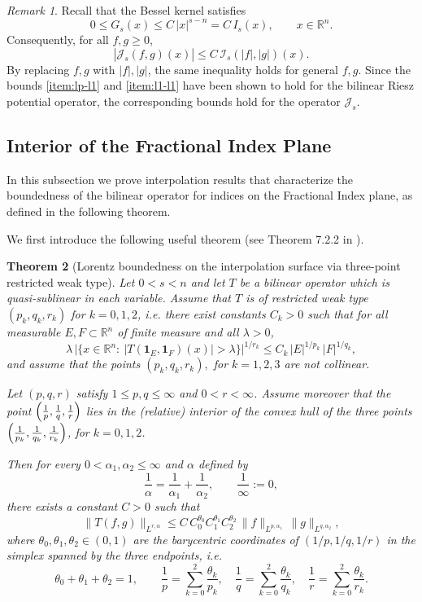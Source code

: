 \documentclass[12pt]{article}
\newtheorem{theorem}{Theorem}[section]
\theoremstyle{definition}
\theoremstyle{remark}
\newtheorem{remark}[theorem]{Remark}
\numberwithin{equation}{section}
\begin{document}
\begin{remark}
Recall that the Bessel kernel satisfies
\[
0\le G_s(x)\le C\,|x|^{s-n}=C\,I_s(x),
\qquad x\in\mathbb R^n.
\]
Consequently, for all $f,g\ge0$,
\begin{equation} \label{eq:riesz-dominates}
|\mathcal{J}_s(f,g)(x)|
\le C\,\mathcal{I}_s(|f|,|g|)(x).
\end{equation}
By replacing $f,g$ with $|f|,|g|$, the same inequality holds for general $f,g$.
Since the bounds \eqref{item:lp-l1} and \eqref{item:l1-l1} have been shown to hold for the bilinear Riesz potential operator,
the corresponding bounds hold for the operator $\mathcal{J}_s$.
\end{remark} 


\subsection{Interior of the Fractional Index Plane}

In this subsection we prove interpolation results that characterize the boundedness of the bilinear operator for indices on the Fractional Index plane, as defined in the following theorem. 

We first introduce the following useful theorem (see Theorem 7.2.2 in \cite{GraMod}).
\begin{theorem}[Lorentz boundedness on the interpolation surface via three-point restricted weak type]
\label{lem:convex-hull-surface}
Let $0<s<n$ and let $T$ be a bilinear operator which is quasi-sublinear in each variable. 
Assume that $T$ is of restricted weak type $(p_k,q_k,r_k)$ for $k=0,1,2$, i.e.
there exist constants $C_k>0$ such that for all measurable $E,F\subset\mathbb R^n$
of finite measure and all $\lambda>0$,
\begin{equation}\label{eq:rwk-3pts}
\lambda\,
\bigl|\{x\in\mathbb R^n:\ |T(\mathbf 1_E,\mathbf 1_F)(x)|>\lambda\}\bigr|^{1/r_k}
\le C_k\,|E|^{1/p_k}\,|F|^{1/q_k},
\end{equation} and assume that the points $(p_k,q_k,r_k),$ for $k=1,2,3$ are not collinear.

Let $(p,q,r)$ satisfy $1\le p,q\le\infty$ and $0<r<\infty$.
Assume moreover that the point $\Bigl(\frac1p,\frac1q,\frac1r\Bigr)$ lies in the (relative) interior of the convex hull of the three points
$\Bigl(\frac1{p_k},\frac1{q_k},\frac1{r_k}\Bigr)$, for $k=0,1,2$.

Then for every $0<\alpha_1,\alpha_2\le\infty$ and $\alpha$ defined by
\[
\frac1\alpha=\frac1{\alpha_1}+\frac1{\alpha_2},
\qquad \frac1\infty:=0,
\]
there exists a constant $C>0$ such that
\[
\|T(f,g)\|_{L^{r,\alpha}}
\le
C\,
C_0^{\theta_0}C_1^{\theta_1}C_2^{\theta_2}\,
\|f\|_{L^{p,\alpha_1}}\,
\|g\|_{L^{q,\alpha_2}},
\]
where $\theta_0,\theta_1,\theta_2\in(0,1)$ are the barycentric coordinates of
$(1/p,1/q,1/r)$ in the simplex spanned by the three endpoints, i.e.
\[
\theta_0+\theta_1+\theta_2=1,\qquad
\frac1p=\sum_{k=0}^2\frac{\theta_k}{p_k},\quad
\frac1q=\sum_{k=0}^2\frac{\theta_k}{q_k},\quad
\frac1r=\sum_{k=0}^2\frac{\theta_k}{r_k}.
\]
\end{theorem}
\end{document}
